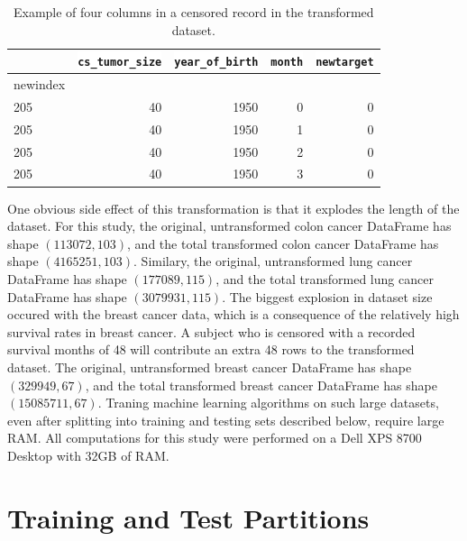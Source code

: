 \documentclass[a4paper,11pt]{article}
\newcommand{\codewhite}[1]{\colorbox{white}{\texttt{#1}}}
\begin{document}
\begin{table}[tbp]
\begin{center}
\begin{tabular}{lrrrr}
\toprule
{} &  \codewhite{cs\_tumor\_size} &  \codewhite{year\_of\_birth} &  \codewhite{month} &  \codewhite{newtarget} \\
\midrule
newindex &                &                &        &            \\
205      &             40 &           1950 &      0 &          0 \\
205      &             40 &           1950 &      1 &          0 \\
205      &             40 &           1950 &      2 &          0 \\
205      &             40 &           1950 &      3 &          0 \\
\bottomrule
\end{tabular}
\caption{\label{tab:transformedalive} Example of four columns in a censored record in the transformed dataset.}
\end{center}
\end{table}

One obvious side effect of this transformation is that it explodes the length of the dataset.
For this study, the original, untransformed colon cancer DataFrame has shape $(113072, 103)$, and the total transformed colon cancer DataFrame has shape $(4165251, 103)$.
Similary, the original, untransformed lung cancer DataFrame has shape $(177089, 115)$, and the total transformed lung cancer DataFrame has shape $(3079931, 115)$.
The biggest explosion in dataset size occured with the breast cancer data, which is a consequence of the relatively high survival rates in breast cancer. A subject who is censored with a recorded survival months of 48 will contribute an extra 48 rows to the transformed dataset.  
The original, untransformed breast cancer DataFrame has shape $(329949, 67)$, and the total transformed breast cancer DataFrame has shape $(15085711, 67)$.
Traning machine learning algorithms on such large datasets, even after splitting into training and testing sets described below, require large RAM. All computations for this study were performed on a Dell XPS 8700 Desktop with 32GB of RAM.



\section{Training and Test Partitions}
\label{subsec:traintest}
\end{document}
